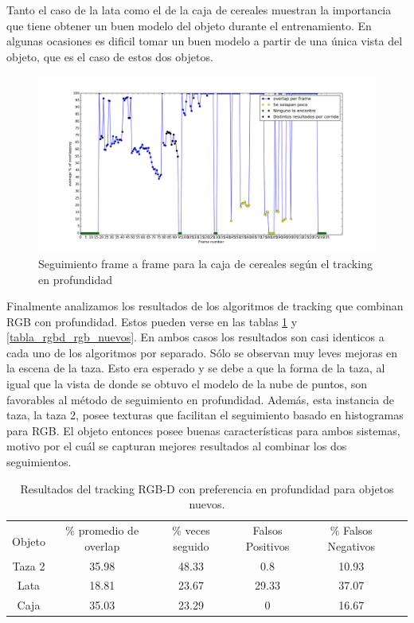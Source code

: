 Tanto el caso de la lata como el de la caja de cereales muestran la importancia que tiene obtener un buen modelo del objeto durante el entrenamiento. En algunas ocasiones es dificil tomar un buen modelo a partir de una única vista del objeto, que es el caso de estos dos objetos.

\begin{figure}
	\centering
	\includegraphics[width=\textwidth]{img/frame_a_frame/depth-caja.png}
	\caption{Seguimiento frame a frame para la caja de cereales según el tracking en profundidad}
	\label{frame_frame_d_nuevo}
\end{figure}


Finalmente analizamos los resultados de los algoritmos de tracking que combinan RGB con profundidad. Estos pueden verse en las tablas \ref{tabla_rgbd_d_nuevos} y \ref{tabla_rgbd_rgb_nuevos}. En ambos casos los resultados son casi identicos a cada uno de los algoritmos por separado. Sólo se observan muy leves mejoras en la escena de la taza. Esto era esperado y se debe a que la forma de la taza, al igual que la vista de donde se obtuvo el modelo de la nube de puntos, son favorables al método de seguimiento en profundidad. Además, esta instancia de taza, la taza 2, posee texturas que facilitan el seguimiento basado en histogramas para RGB. El objeto entonces posee buenas características para ambos sistemas, motivo por el cuál se capturan mejores resultados al combinar los dos seguimientos.

\begin{table}[h]
	\centering
    \begin{tabular}{|c|c|c|c|c|c|}
    \hline
    & \multirow{2}{2.4cm}{\% promedio de overlap} & \multirow{2}{2cm}{\% veces seguido} & \multirow{2}{1.6cm}{Falsos Positivos} & \multirow{2}{1.6cm}{\% Falsos Negativos}\\
	Objeto & & & &\\
    \hline
    Taza 2  & 35.98      & 48.33      & 0.8     & 10.93 \\
    \hline
    Lata    & 18.81      & 23.67      & 29.33   & 37.07 \\
    \hline
    Caja    & 35.03      & 23.29      & 0       & 16.67 \\
    \hline
    \end{tabular}
\caption{Resultados del tracking RGB-D con preferencia en profundidad para objetos nuevos.}
\label{tabla_rgbd_d_nuevos}
\end{table}


